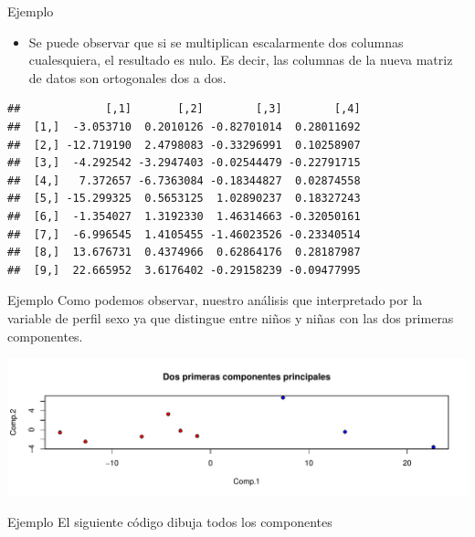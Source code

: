 \documentclass[
  ignorenonframetext,
]{beamer}
\newenvironment{Shaded}{\begin{snugshade}}{\end{snugshade}}
\newcommand{\AttributeTok}[1]{\textcolor[rgb]{0.13,0.29,0.53}{#1}}
\newcommand{\DecValTok}[1]{\textcolor[rgb]{0.00,0.00,0.81}{#1}}
\newcommand{\FunctionTok}[1]{\textcolor[rgb]{0.13,0.29,0.53}{\textbf{#1}}}
\newcommand{\NormalTok}[1]{#1}
\newcommand{\SpecialCharTok}[1]{\textcolor[rgb]{0.81,0.36,0.00}{\textbf{#1}}}
\newcommand{\StringTok}[1]{\textcolor[rgb]{0.31,0.60,0.02}{#1}}
\providecommand{\tightlist}{%
  \setlength{\itemsep}{0pt}\setlength{\parskip}{0pt}}
\begin{document}
\begin{frame}[fragile]{Ejemplo}
\label{ejemplo-7}
\begin{itemize}
\tightlist
\item
  Se puede observar que si se multiplican escalarmente dos columnas
  cualesquiera, el resultado es nulo. Es decir, las columnas de la nueva
  matriz de datos son ortogonales dos a dos.
\end{itemize}

\begin{verbatim}
##             [,1]       [,2]        [,3]        [,4]
##  [1,]  -3.053710  0.2010126 -0.82701014  0.28011692
##  [2,] -12.719190  2.4798083 -0.33296991  0.10258907
##  [3,]  -4.292542 -3.2947403 -0.02544479 -0.22791715
##  [4,]   7.372657 -6.7363084 -0.18344827  0.02874558
##  [5,] -15.299325  0.5653125  1.02890237  0.18327243
##  [6,]  -1.354027  1.3192330  1.46314663 -0.32050161
##  [7,]  -6.996545  1.4105455 -1.46023526 -0.23340514
##  [8,]  13.676731  0.4374966  0.62864176  0.28187987
##  [9,]  22.665952  3.6176402 -0.29158239 -0.09477995
\end{verbatim}
\end{frame}

\begin{frame}{Ejemplo}
\label{ejemplo-8}
Como podemos observar, nuestro análisis que interpretado por la variable
de perfil sexo ya que distingue entre niños y niñas con las dos primeras
componentes.

\includegraphics{AnalisisComponentesPrincipales_fusion_files/figure-beamer/plotACP1-1.pdf}
\end{frame}

\begin{frame}[fragile]{Ejemplo}
\label{ejemplo-9}
El siguiente código dibuja todos los componentes

\begin{Shaded}
\end{Shaded}
\end{frame}
\end{document}
